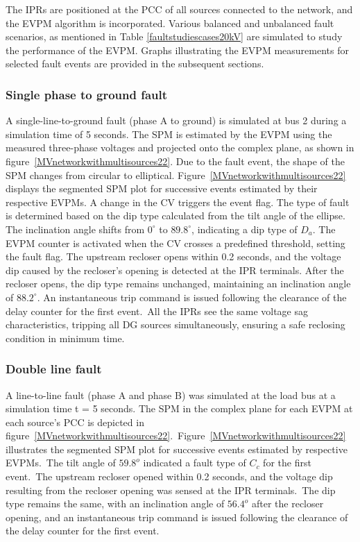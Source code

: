 The IPRs are positioned at the PCC of all sources connected to the network, and the EVPM algorithm is incorporated. Various balanced and unbalanced fault scenarios, as mentioned in Table \ref{faultstudiescases20kV} are simulated to study the performance of the EVPM. Graphs illustrating the EVPM measurements for selected fault events are provided in the subsequent sections.

\subsubsection{Single phase to ground fault}
A single-line-to-ground fault (phase A to ground) is simulated at bus 2 during a simulation time of 5 seconds. The SPM is estimated by the EVPM using the measured three-phase voltages and projected onto the complex plane, as shown in figure~\ref{MVnetworkwithmultisources22}. Due to the fault event, the shape of the SPM changes from circular to elliptical. Figure~\ref{MVnetworkwithmultisources22} displays the segmented SPM plot for successive events estimated by their respective EVPMs. A change in the CV triggers the event flag. The type of fault is determined based on the dip type calculated from the tilt angle of the ellipse. The inclination angle shifts from \(0^\circ\) to \(89.8^\circ\), indicating a dip type of \(D_a\). The EVPM counter is activated when the CV crosses a predefined threshold, setting the fault flag. The upstream recloser opens within 0.2 seconds, and the voltage dip caused by the recloser's opening is detected at the IPR  terminals. After the recloser opens, the dip type remains unchanged, maintaining an inclination angle of \(88.2^\circ\). An instantaneous trip command is issued following the clearance of the delay counter for the first event.~All the IPRs see the same voltage sag characteristics, tripping all DG sources simultaneously, ensuring a safe reclosing condition in minimum time.

\subsubsection{Double line fault}
A line-to-line fault (phase A and phase B) was simulated at the load bus at a simulation time t = 5 seconds. The SPM in the complex plane for each EVPM at each source’s PCC is depicted in figure~\ref{MVnetworkwithmultisources22}.~Figure~\ref{MVnetworkwithmultisources22} illustrates the segmented SPM plot for successive events estimated by respective EVPMs.~The tilt angle of $59.8^o$ indicated a fault type of $C_c$ for the first event.~The upstream recloser opened within 0.2 seconds, and the voltage dip resulting from the recloser opening was sensed at the IPR terminals.~The dip type remains the same, with an inclination angle of $ 56.4^o$  after the recloser opening, and an instantaneous trip command is issued following the clearance of the delay counter for the first event.


